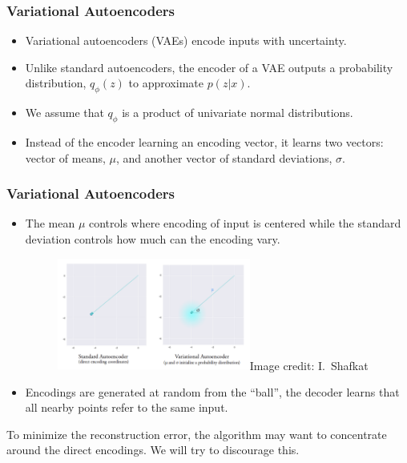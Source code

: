 \documentclass[handout,aspectratio=169]{beamer}
\begin{document}
\begin{frame}
  \frametitle{Variational Autoencoders}
  \begin{itemize}
  \item Variational autoencoders (VAEs) encode inputs with uncertainty.\\[3mm]

  \item Unlike standard autoencoders, the encoder of a VAE outputs a probability distribution, $q_\phi(z )$ to approximate $p(z|x)$.\\[3mm]
  \item We assume that $q_\phi$ is a product of univariate normal distributions.
  \item Instead of the encoder learning an encoding vector, it learns two vectors: vector of means,  $\mu$, and another vector of standard deviations,  $\sigma$.

  \end{itemize}
\end{frame}


\begin{frame}
  \frametitle{Variational Autoencoders}
  \begin{itemize}

  \item The mean $\mu$ controls where encoding of input is centered while the standard deviation controls how much can the encoding vary.

    \begin{figure}
      \centering
      \includegraphics[width=2.5in]{pics/random-vae.png}{\tiny Image credit: I.~Shafkat}
    \end{figure}

  \item Encodings are generated at random from the ``ball'', the decoder learns that all nearby points refer to the same input. 
  \end{itemize}
  To minimize the reconstruction error, the algorithm may want to concentrate around the direct encodings. We will try to discourage this. 
\end{frame}
\end{document}
